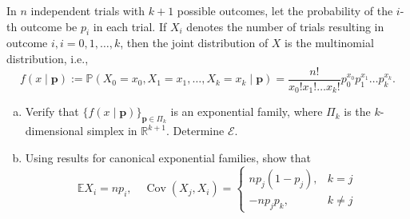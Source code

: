 \begin{ex}
	In \(n\) independent trials with \(k+1\) possible outcomes, let the probability of the \(i\)-th outcome be \(p_{i}\) in each trial. If \(X_{i}\) denotes the number of trials resulting in outcome \(i, i=0,1, \ldots, k\), then the joint distribution of \(X\) is the multinomial distribution, i.e.,
	\[
		f( x \mid \mathbf{p}):=\mathbb{P}\left(X_{0}=x_{0}, X_{1}=x_{1}, \ldots, X_{k}=x_{k} \mid \mathbf{p}\right)=\frac{n !}{x_{0} ! x_{1} ! \ldots x_{k} !} p_{0}^{x_{0}} p_{1}^{x_{1}} \ldots p_{k}^{x_{k}}.
	\]
	\begin{enumerate}[(a)]
		\item Verify that \(\{f( x \mid \mathbf{p})\}_{\mathbf{p} \in \Pi_{k}}\) is an exponential family, where \(\Pi_{k}\) is the \(k\)-dimensional simplex in \(\mathbb{R}^{k+1}\). Determine \(\mathcal{E}\).
		\item Using results for canonical exponential families, show that
		\[
			\mathbb{E} X_{i}=n p_{i}, \quad \operatorname{Cov}\left(X_{j}, X_{i}\right)=\left\{\begin{array}{cc}
			n p_{j}\left(1-p_{j}\right), & k=j \\
			-n p_{j} p_{k}, & k \neq j
		\end{array}\right.
		\]
	\end{enumerate}
\end{ex}


